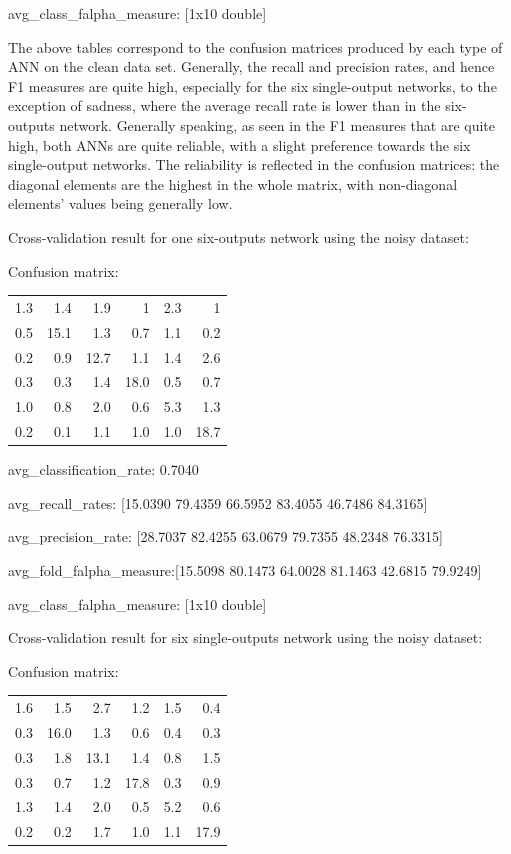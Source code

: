 \documentclass[a4wide, 11pt]{article}
\begin{document}
avg\_class\_falpha\_measure: {[}1x10 double{]}

The above tables correspond to the confusion matrices produced by each type of ANN on the clean data set.  Generally, the recall and precision rates, and hence F1 measures are quite high, especially for the six single-output networks, to the exception of  sadness, where the average recall rate is lower than in the six-outputs network.  Generally speaking, as seen in the F1 measures that are quite high, both ANNs are quite reliable, with a slight preference towards the six single-output networks. The reliability is reflected in the confusion matrices: the diagonal elements are the highest in the whole matrix, with non-diagonal elements’ values being generally low.

Cross-validation result for one six-outputs network using the noisy dataset:

Confusion matrix:
\begin{tabular}{ r r r r r r }
 1.3 & 1.4 & 1.9 & 1 & 2.3 & 1 \\
 0.5 & 15.1 & 1.3 & 0.7 & 1.1 & 0.2 \\
 0.2 & 0.9 & 12.7 & 1.1 & 1.4 & 2.6 \\
 0.3 & 0.3 & 1.4 & 18.0 & 0.5 & 0.7 \\
 1.0 & 0.8 & 2.0 & 0.6 & 5.3 & 1.3 \\
 0.2 & 0.1 & 1.1 & 1.0 & 1.0 & 18.7 \\
\end{tabular}

 avg\_classification\_rate: 0.7040

avg\_recall\_rates: {[}15.0390 79.4359 66.5952 83.4055 46.7486 84.3165{]}

avg\_precision\_rate: {[}28.7037 82.4255 63.0679 79.7355 48.2348 76.3315{]}

avg\_fold\_falpha\_measure:{[}15.5098 80.1473 64.0028 81.1463 42.6815 79.9249{]}

avg\_class\_falpha\_measure: {[}1x10 double{]}


Cross-validation result for six single-outputs network using the noisy dataset:

Confusion matrix:
\begin{tabular}{ r r r r r r }
 1.6 & 1.5 & 2.7 & 1.2 & 1.5 & 0.4 \\
 0.3 & 16.0 & 1.3 & 0.6 & 0.4 & 0.3 \\
 0.3 & 1.8 & 13.1 & 1.4 & 0.8 & 1.5 \\
 0.3 & 0.7 & 1.2 & 17.8 & 0.3 & 0.9 \\
 1.3 & 1.4 & 2.0 & 0.5 & 5.2 & 0.6 \\
 0.2 & 0.2 & 1.7 & 1.0 & 1.1 & 17.9 \\
\end{tabular}
\end{document}
